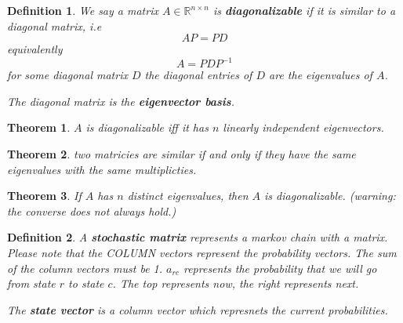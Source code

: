 \documentclass[11pt]{article}
\newtheorem{thm}{Theorem}
\newtheorem{defn}{Definition}
\begin{document}
\begin{defn}
  We say a matrix
  $A \in \mathbb{R}^{n \times n}$
  is \textbf{diagonalizable}
  if it is similar to a diagonal matrix, i.e
  \[AP = PD\]
  equivalently
  \[A = PDP^{-1}\]
  for some diagonal matrix $D$
  the diagonal entries of $D$ are the eigenvalues of $A$.

  The diagonal matrix is the \textbf{eigenvector basis}.

\end{defn}
\begin{thm}
  $A$ is diagonalizable iff it has $n$ linearly independent eigenvectors.
\end{thm}
\begin{thm}
  two matricies are similar if and only if they have the same eigenvalues with the same multiplicties.
\end{thm}
\begin{thm}
  If $A$ has $n$ distinct eigenvalues, then $A$ is diagonalizable.
  (warning: the converse does not always hold.)
\end{thm}


\begin{defn}
  A \textbf{stochastic matrix} represents a markov chain with a matrix.
  Please note that the COLUMN vectors represent the probability vectors.
  The sum of the column vectors must be 1.
  $a_{rc}$ represents the probability that we will go from state $r$ to state $c$.
  The top represents now, the right represents next.

  The \textbf{state vector} is a column vector which represnets the current probabilities.
\end{defn}
\end{document}

